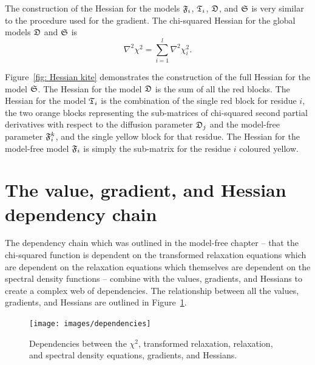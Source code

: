 The construction of the Hessian for the models $\mathfrak{F}_i$, $\mathfrak{T}_i$, $\mathfrak{D}$, and $\mathfrak{S}$ is very similar to the procedure used for the gradient.
The chi-squared Hessian for the global models $\mathfrak{D}$ and $\mathfrak{S}$ is
\begin{equation} \label{eq: spaceset Hessian}
    \nabla^2 \chi^2 = \sum_{i=1}^l \nabla^2 \chi^2_i.
\end{equation}

\noindent Figure~\ref{fig: Hessian kite} demonstrates the construction of the full Hessian for the model $\mathfrak{S}$.
The Hessian for the model $\mathfrak{D}$ is the sum of all the red blocks.
The Hessian for the model $\mathfrak{T}_i$ is the combination of the single red block for residue $i$, the two orange blocks representing the sub-matrices of chi-squared second partial derivatives with respect to the diffusion parameter $\mathfrak{D}_j$ and the model-free parameter $\mathfrak{F}_i^k$, and the single yellow block for that residue.
The Hessian for the model-free model $\mathfrak{F}_i$ is simply the sub-matrix for the residue $i$ coloured yellow.




\section{The value, gradient, and Hessian dependency chain}

The dependency chain which was outlined in the model-free chapter -- that the chi-squared function is dependent on the transformed relaxation equations which are dependent on the relaxation equations which themselves are dependent on the spectral density functions -- combine with the values, gradients, and Hessians to create a complex web of dependencies.
The relationship between all the values, gradients, and Hessians are outlined in Figure~\ref{fig: dependencies}.

\begin{figure}
\centerline{\texttt{[image: images/dependencies]}}
\caption[$\chi^2$ dependencies of the values, gradients, and Hessians.]{Dependencies between the $\chi^2$, transformed relaxation, relaxation, and spectral density equations, gradients, and Hessians.}\label{fig: dependencies}
\end{figure}




